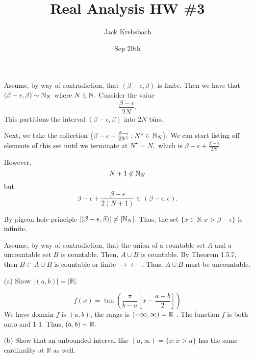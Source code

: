 \documentclass{report}
\title{Real Analysis HW \#3}
\author{Jack Krebsbach }
\date{Sep 20th}
\newcommand{\contra}{
$\rightarrow\!\leftarrow$
}
\begin{document}
\maketitle


\sol
\begin{myproof}
    
Assume, by way of contradiction, that $(\beta - \epsilon, \beta)$ is finite. Then we have that $(\beta - \epsilon,\beta) \sim \NN_{N}$ where $N \in \NN.$ Consider the value $$\frac{\beta - \epsilon}{2N}.$$ This partitions the interval $(\beta - \epsilon, \beta)$ into $2N$ bins. 

Next, we take the collection $\{ \beta - \epsilon + \frac{\beta - \epsilon}{2N^\star}  \colon  N^\star \in \NN_N\}.$ We can start listing off elements of this set until we terminate at $N^\star = N,$ which is $ \beta - \epsilon + \frac{\beta-\epsilon}{2N}$.\par However, $$N + 1 \not\in \NN_N$$ but 
$$ \beta - \epsilon + \frac{\beta - \epsilon}{2(N+1)} \in (\beta - \epsilon, \epsilon).$$

By pigeon hole principle $|(\beta-\epsilon, \beta)| \neq |\NN_N|.$ Thus, the set $\{x \in S: x>\beta-\epsilon\}$ is infinite.

\end{myproof}
\begin{myproof}
  Assume, by way of contradiction, that the union of a countable set $A$ and a uncountable set $B$ is countable. Then, $A \cup B$ is countable. By Theorem 1.5.7, then $B \subset A \cup B$ is countable or finite \contra. Thus, $A \cup B$ must be uncountable. 

  
\end{myproof}

(a) Show $|(a, b)|=|\mathbb{R}|$. 


\sol
$$
f(x) = \tan\left(\frac{\pi}{b-a}\left[x - \frac{a+b}{2}\right]\right)
$$
We have domain $f$ is $(a,b)$, the range is $(-\infty, \infty) = \RR$ . The function $f$ is both onto and 1-1. Thus, $(a,b) \sim \RR.$

\par \bigskip
(b) Show that an unbounded interval like $(a, \infty)=\{x: x>a\}$ has the same cardinality at $\mathbb{R}$ as well.
\end{document}
